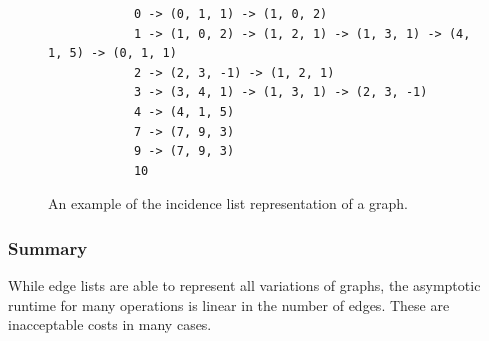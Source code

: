         \begin{figure}[htp]
         \begin{center}
          \begin{verbatim}
            0 -> (0, 1, 1) -> (1, 0, 2)
            1 -> (1, 0, 2) -> (1, 2, 1) -> (1, 3, 1) -> (4, 1, 5) -> (0, 1, 1)
            2 -> (2, 3, -1) -> (1, 2, 1)
            3 -> (3, 4, 1) -> (1, 3, 1) -> (2, 3, -1)
            4 -> (4, 1, 5)
            7 -> (7, 9, 3)
            9 -> (7, 9, 3)
            10
          \end{verbatim}
         \end{center}
         \caption{An example of the incidence list representation of a graph.}
         \label{incidencel}
        \end{figure}
        
        
        
        \subsubsection*{Summary}
        While edge lists are able to represent all variations of graphs, the asymptotic runtime for many operations is linear in the number of edges. 
        These are inacceptable costs in many cases. \\
        
